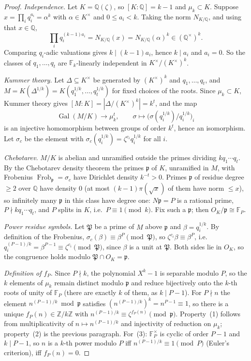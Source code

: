 \documentclass[11pt]{article}
\numberwithin{equation}{section}
\theoremstyle{definition}
\theoremstyle{remark}
\newcommand{\Q}{\mathbb Q}
\newcommand{\Z}{\mathbb Z}
\newcommand{\F}{\mathbb F}
\newcommand{\p}{\mathfrak p}
\newcommand{\PP}{\mathfrak P}
\DeclareMathOperator{\Gal}{Gal}
\DeclareMathOperator{\Frob}{Frob}
\begin{document}
\begin{proof}
\emph{Independence.} Let $K=\Q(\zeta)$, so $[K:\Q]=k-1$ and $\mu_k\subset K$. Suppose
$x=\prod_i q_i^{a_i}=\alpha^k$ with $\alpha\in K^\times$ and $0\le a_i<k$. Taking the norm
$N_{K/\Q}$, and using that $x\in\Q$,
\[
  \prod_i q_i^{(k-1)a_i}=N_{K/\Q}(x)=N_{K/\Q}(\alpha)^k\in(\Q^\times)^k .
\]
Comparing $q_i$-adic valuations gives $k\mid(k-1)a_i$, hence $k\mid a_i$ and $a_i=0$. So the classes of
$q_1,\dots,q_t$ are $\F_k$-linearly independent in $K^\times/(K^\times)^k$.

\emph{Kummer theory.} Let $\Delta\subseteq K^\times$ be generated by $(K^\times)^k$ and $q_1,\dots,q_t$,
and $M=K(\Delta^{1/k})=K(q_1^{1/k},\dots,q_t^{1/k})$ for fixed choices of the roots. Since
$\mu_k\subset K$, Kummer theory gives $[M:K]=|\Delta/(K^\times)^k|=k^t$, and the map
\[
  \Gal(M/K)\to\mu_k^t,\qquad \sigma\mapsto\bigl(\sigma(q_i^{1/k})/q_i^{1/k}\bigr)_{i}
\]
is an injective homomorphism between groups of order $k^t$, hence an isomorphism. Let $\sigma_c$ be
the element with $\sigma_c(q_i^{1/k})=\zeta^{c_i}q_i^{1/k}$ for all $i$.

\emph{Chebotarev.} $M/K$ is abelian and unramified outside the primes dividing $kq_1\cdots q_t$. By the
Chebotarev density theorem the primes $\p$ of $K$, unramified in $M$, with Frobenius
$\Frob_\p=\sigma_c$ have Dirichlet density $k^{-t}>0$. Primes $\p$ of residue degree $\ge2$ over $\Q$
have density $0$ (at most $(k-1)\pi(\sqrt x)$ of them have norm $\le x$), so infinitely many $\p$ in
this class have degree one: $N\p=P$ is a rational prime, $P\nmid kq_1\cdots q_t$, and $P$ splits in
$K$, i.e.\ $P\equiv1\pmod k$. Fix such a $\p$; then $O_K/\p\cong\F_P$.

\emph{Power residue symbols.} Let $\PP$ be a prime of $M$ above $\p$ and $\beta=q_i^{1/k}$. By definition
of the Frobenius, $\sigma_c(\beta)\equiv\beta^{P}\pmod\PP$, so
$\zeta^{c_i}\beta\equiv\beta^P$, i.e.\ $q_i^{(P-1)/k}=\beta^{P-1}\equiv\zeta^{c_i}\pmod\PP$, since $\beta$ is
a unit at $\PP$. Both sides lie in $O_K$, so the congruence holds modulo $\PP\cap O_K=\p$.

\emph{Definition of $f_P$.} Since $P\nmid k$, the polynomial $X^k-1$ is separable modulo $P$, so the $k$
elements of $\mu_k$ remain distinct modulo $\p$ and reduce bijectively onto the $k$-th roots of unity
of $\F_P$ (there are exactly $k$ of them, as $k\mid P-1$). For $P\nmid n$ the element
$n^{(P-1)/k}\bmod\p$ satisfies $(n^{(P-1)/k})^k=n^{P-1}\equiv1$, so there is a unique
$f_P(n)\in\Z/k\Z$ with $n^{(P-1)/k}\equiv\zeta^{f_P(n)}\pmod\p$. Property~(1) follows from
multiplicativity of $n\mapsto n^{(P-1)/k}$ and injectivity of reduction on $\mu_k$; property~(2) is the
previous paragraph. For~(3): $\F_P^\times$ is cyclic of order $P-1$ and $k\mid P-1$, so $n$ is a $k$-th
power modulo $P$ iff $n^{(P-1)/k}\equiv1\pmod P$ (Euler's criterion), iff $f_P(n)=0$.
\end{proof}
\end{document}
